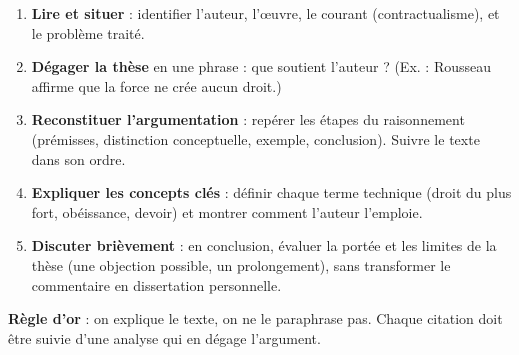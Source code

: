 \documentclass[11pt]{article}
\newcommand{\cle}[1]{{\popxbold\color{popdark}#1}}
\begin{document}
\begin{methode}
\begin{enumerate}
\item \textbf{Lire et situer} : identifier l'auteur, l'œuvre, le courant (contractualisme), et le problème traité.
\item \textbf{Dégager la thèse} en une phrase : que soutient l'auteur ? (Ex. : Rousseau affirme que la force ne crée aucun droit.)
\item \textbf{Reconstituer l'argumentation} : repérer les étapes du raisonnement (prémisses, distinction conceptuelle, exemple, conclusion). Suivre le texte dans son ordre.
\item \textbf{Expliquer les concepts clés} : définir chaque terme technique (\cle{droit du plus fort}, \cle{obéissance}, \cle{devoir}) et montrer comment l'auteur l'emploie.
\item \textbf{Discuter brièvement} : en conclusion, évaluer la portée et les limites de la thèse (une objection possible, un prolongement), sans transformer le commentaire en dissertation personnelle.
\end{enumerate}
\textbf{Règle d'or} : on explique le texte, on ne le paraphrase pas. Chaque citation doit être suivie d'une analyse qui en dégage l'argument.
\end{methode}
\end{document}
